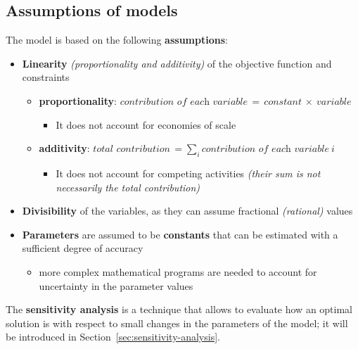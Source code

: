 \documentclass[english]{article}
\begin{document}
\subsection{Assumptions of \LP models}

The \LP model is based on the following \textbf{assumptions}:

\begin{itemize}
  \item \textbf{Linearity} \textit{(proportionality and additivity)} of the objective function and constraints
        \begin{itemize}[label=\(\rightarrow\)]
          \item \textbf{proportionality}: \( \textit{contribution of each variable} \, = \, \textit{constant} \, \times \ \textit{variable} \)
                \begin{itemize}[label=\xmarkthin]
                  \item It does not account for economies of scale
                \end{itemize}
          \item \textbf{additivity}: \(\textit{total contribution} \, =\sum_i \textit{contribution of each variable} \ i\)
                \begin{itemize}[label=\xmarkthin]
                  \item It does not account for competing activities \textit{(their sum is not necessarily the total contribution)}
                \end{itemize}
        \end{itemize}
  \item \textbf{Divisibility} of the variables, as they can assume fractional \textit{(rational)} values
  \item \textbf{Parameters} are assumed to be \textbf{constants} that can be estimated with a sufficient degree of accuracy
        \begin{itemize}[label=\xmarkthin]
          \item more complex mathematical programs are needed to account for uncertainty in the parameter values
        \end{itemize}
\end{itemize}

The \textbf{sensitivity analysis} is a technique that allows to evaluate how  an optimal solution is with respect to small changes in the parameters of the model;
it will be introduced in Section~\ref{sec:sensitivity-analysis}.
\end{document}

